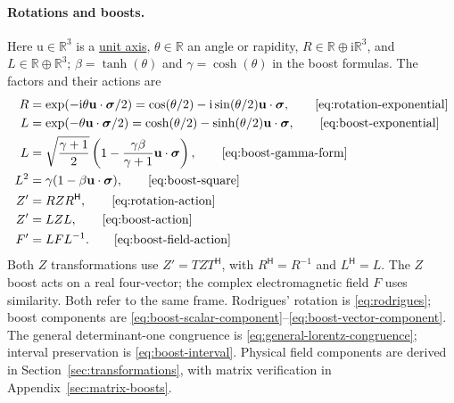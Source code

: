 \documentclass[11pt]{article}
\newcommand{\pv}[1]{{#1}}
\newcommand{\vstyle}[1]{{\bm{\mathrm{#1}}}}
\newcommand{\pF}{\pv{F}}
\newcommand{\pL}{\pv{L}}
\newcommand{\pR}{\pv{R}}
\newcommand{\pT}{\pv{T}}
\newcommand{\pZ}{\pv{Z}}
\numberwithin{equation}{section}
\newcommand{\R}{\mathbb{R}}
\newcommand{\ii}{\mathrm{i}}
\newcommand{\dotprod}{\cdot}
\newcommand{\bsig}{\vstyle{\sigma}}
\newcommand{\bu}{\vstyle{u}}
\begin{document}
\paragraph{Rotations and boosts.}
Here $\bu\in\R^3$ is a \hyperref[def:real-unit-vector]{unit axis},
$\theta\in\R$ an angle or rapidity,
$\pR\in\R\oplus\ii\R^3$, and $\pL\in\R\oplus\R^3$;
$\beta=\tanh(\theta)$ and $\gamma=\cosh(\theta)$ in the boost formulas.
The factors and their actions are
\begin{align*}
 \pR&=\exp(-\ii\theta\bu\dotprod\bsig/2)
   =\cos(\theta/2)-\ii\sin(\theta/2)\bu\dotprod\bsig,
   \tag*{\eqref{eq:rotation-exponential}}\\
 \pL&=\exp(-\theta\bu\dotprod\bsig/2)
   =\cosh(\theta/2)-\sinh(\theta/2)\bu\dotprod\bsig,
   \tag*{\eqref{eq:boost-exponential}}\\
 \pL&=\sqrt{\frac{\gamma+1}{2}}
     \left(1-\frac{\gamma\beta}{\gamma+1}\bu\dotprod\bsig\right),
   \tag*{\eqref{eq:boost-gamma-form}}\\
 \pL^2&=\gamma(1-\beta\bu\dotprod\bsig),
   \tag*{\eqref{eq:boost-square}}\\
 \pZ'&=\pR \pZ \pR^{\mathsf H},
   \tag*{\eqref{eq:rotation-action}}\\
 \pZ'&=\pL \pZ \pL,
   \tag*{\eqref{eq:boost-action}}\\
 \pF'&=\pL \pF \pL^{-1}.
   \tag*{\eqref{eq:boost-field-action}}
\end{align*}
Both $\pZ$ transformations use $\pZ'=\pT \pZ \pT^{\mathsf H}$, with
$\pR^{\mathsf H}=\pR^{-1}$ and $\pL^{\mathsf H}=\pL$.
The $\pZ$ boost acts on a real four-vector; the complex electromagnetic
field $\pF$ uses similarity.  Both refer to the same frame.
Rodrigues' rotation is \eqref{eq:rodrigues}; boost components are
\eqref{eq:boost-scalar-component}--\eqref{eq:boost-vector-component}.
The general determinant-one congruence is
\eqref{eq:general-lorentz-congruence}; interval preservation is
\eqref{eq:boost-interval}.  Physical field components are derived in
Section~\ref{sec:transformations}, with matrix verification in
Appendix~\ref{sec:matrix-boosts}.

\end{document}
